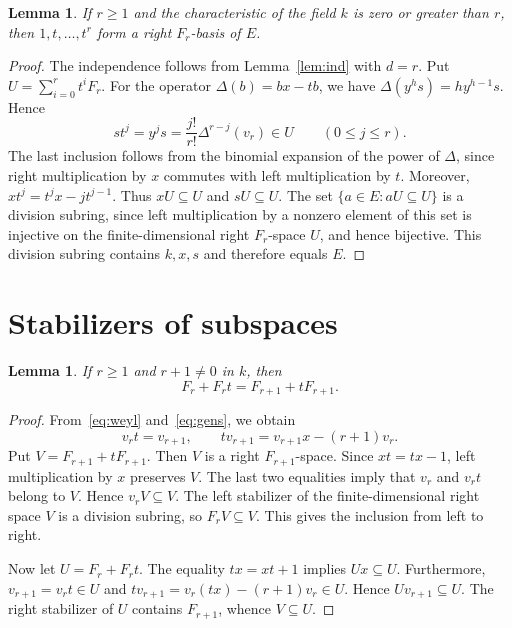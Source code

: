 \documentclass[11pt,a4paper,reqno]{amsart}
\numberwithin{equation}{section}
\newtheorem{lemma}[theorem]{Lemma}
\theoremstyle{remark}
\begin{document}
\begin{lemma}\label{lem:basis}
If $r\ge1$ and the characteristic of the field $k$ is zero or greater than $r$,
then $1,t,\ldots,t^r$ form a right $F_r$-basis of $E$.
\end{lemma}

\begin{proof}
The independence follows from Lemma~\ref{lem:ind} with $d=r$.
Put $U=\sum_{i=0}^r t^i F_r$. For the operator
$\Delta(b)=bx-tb$, we have $\Delta(y^hs)=h y^{h-1}s$. Hence
\[
 st^j=y^j s=\frac{j!}{r!}\Delta^{r-j}(v_r)\in U
 \qquad(0\le j\le r).
\]
The last inclusion follows from the binomial expansion of the power of
$\Delta$, since right multiplication by $x$ commutes with
left multiplication by $t$. Moreover, $xt^j=t^jx-jt^{j-1}$. Thus $xU\subseteq U$
and $sU\subseteq U$. The set $\{a\in E:aU\subseteq U\}$ is a
division subring, since left multiplication by a nonzero element of this set
is injective on the finite-dimensional right $F_r$-space $U$, and hence
bijective. This division subring contains $k,x,s$ and therefore equals $E$.
\end{proof}

\section{Stabilizers of subspaces}

\begin{lemma}\label{lem:adjacent}
If $r\ge1$ and $r+1\ne0$ in $k$, then
\begin{equation}\label{eq:adjacent}
 F_r+F_r t=F_{r+1}+tF_{r+1}.
\end{equation}
\end{lemma}
\begin{proof}
From~\eqref{eq:weyl} and~\eqref{eq:gens}, we obtain
\[
 v_rt=v_{r+1},\qquad
 tv_{r+1}=v_{r+1}x-(r+1)v_r .
\]
Put $V=F_{r+1}+tF_{r+1}$. Then $V$ is a right $F_{r+1}$-space.
Since $xt=tx-1$, left multiplication by $x$ preserves $V$.
The last two equalities imply that $v_r$ and $v_r t$ belong to $V$.
Hence $v_rV\subseteq V$. The left stabilizer of the finite-dimensional right
space $V$ is a division subring, so $F_r V\subseteq V$.
This gives the inclusion from left to right.

Now let $U=F_r+F_rt$. The equality $tx=xt+1$ implies $Ux\subseteq U$.
Furthermore, $v_{r+1}=v_rt\in U$ and
$tv_{r+1}=v_r(tx)-(r+1)v_r\in U$. Hence
$Uv_{r+1}\subseteq U$. The right stabilizer of $U$ contains $F_{r+1}$,
whence $V\subseteq U$.
\end{proof}
\end{document}
